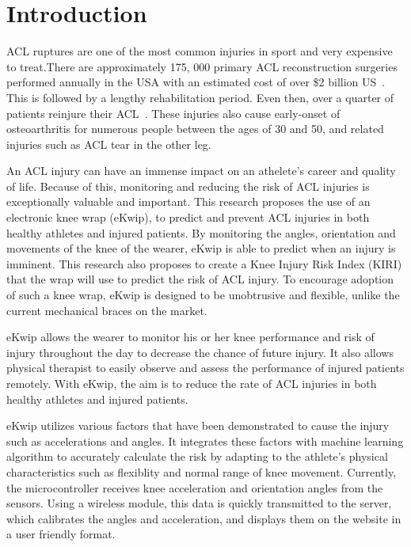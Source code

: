 \documentclass{sig-alternate}
\begin{document}
\section{Introduction}
\label{sec:intro}
ACL ruptures are one of the most common injuries in sport and very expensive to treat.There are approximately 175, 000 primary ACL reconstruction surgeries performed annually in the USA with an estimated cost of over \$2 billion US~\cite{yu2007mechanisms}. This is followed by a lengthy rehabilitation period. Even then, over a quarter of patients reinjure their ACL~\cite{stevenson1998gender}. These injuries also cause early-onset of osteoarthritis for numerous people between the ages of 30 and 50, and related injuries such as ACL tear in the other leg.~\cite{2d7e8810e30d11dd990c000ea68e967b}

An ACL injury can have an immense impact on an athelete's career and quality of life. Because of this, monitoring and reducing the risk of ACL injuries is exceptionally valuable and important. This research proposes the use of an electronic knee wrap (eKwip), to predict and prevent ACL injuries in both healthy athletes and injured patients. By monitoring the angles, orientation and movements of the knee of the wearer, eKwip is able to predict when an injury is imminent. This research also proposes to create a Knee Injury Risk Index (KIRI) that the wrap will use to predict the risk of ACL injury. To encourage adoption of such a knee wrap, eKwip is designed to be unobtrusive and flexible, unlike the current mechanical braces on the market.

eKwip allows the wearer to monitor his or her knee performance and risk of injury throughout the day to decrease the chance of future injury. It also allows physical therapist to easily observe and assess the performance of injured patients remotely. With eKwip, the aim is to reduce the rate of ACL injuries in both healthy athletes and injured patients.

eKwip utilizes various factors that have been demonstrated to cause the injury such as accelerations and angles. It integrates these factors with machine learning algorithm to accurately calculate the risk by adapting to the athlete's physical characteristics such as flexiblity and normal range of knee movement. Currently, the microcontroller receives knee acceleration and orientation angles from the sensors. Using a wireless module, this data is quickly transmitted to the server, which calibrates the angles and acceleration, and displays them on the website in a user friendly format.
\end{document}
